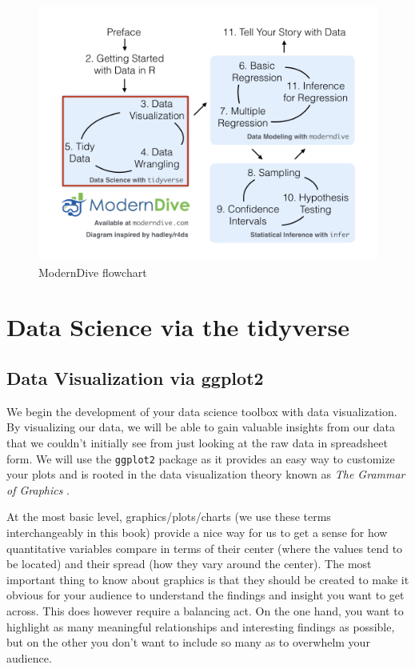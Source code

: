 \documentclass[12pt,]{krantz}
\theoremstyle{definition}
\theoremstyle{definition}
\theoremstyle{definition}
\theoremstyle{remark}
\begin{document}
\begin{figure}

{\centering \includegraphics[width=1.1\linewidth]{images/flowcharts/flowchart/flowchart.004} 

}

\caption{ModernDive flowchart}\label{fig:unnamed-chunk-10}
\end{figure}

\part{Data Science via the
tidyverse}\label{part-data-science-via-the-tidyverse}

\chapter{Data Visualization via ggplot2}\label{viz}

We begin the development of your data science toolbox with data
visualization. By visualizing our data, we will be able to gain valuable
insights from our data that we couldn't initially see from just looking
at the raw data in spreadsheet form. We will use the \texttt{ggplot2}
package as it provides an easy way to customize your plots and is rooted
in the data visualization theory known as \emph{The Grammar of Graphics}
\citep{wilkinson2005}.

At the most basic level, graphics/plots/charts (we use these terms
interchangeably in this book) provide a nice way for us to get a sense
for how quantitative variables compare in terms of their center (where
the values tend to be located) and their spread (how they vary around
the center). The most important thing to know about graphics is that
they should be created to make it obvious for your audience to
understand the findings and insight you want to get across. This does
however require a balancing act. On the one hand, you want to highlight
as many meaningful relationships and interesting findings as possible,
but on the other you don't want to include so many as to overwhelm your
audience.
\end{document}

